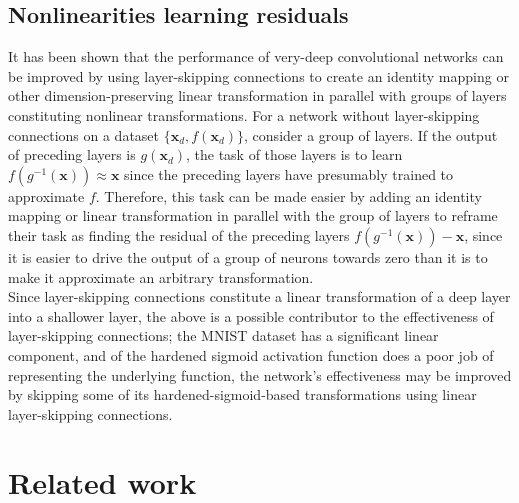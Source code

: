 \documentclass{article}
\newcommand{\mtx}[1]{\bm{#1}}
\newcommand{\npar}{\\\indent}
\begin{document}
\subsection{Nonlinearities learning residuals}
\label{sec:residuals}

It has been shown \cite{he2015, ioffe2015} that the performance of very-deep convolutional networks can be improved by using layer-skipping connections to create an identity mapping or other dimension-preserving linear transformation in parallel with groups of layers constituting nonlinear transformations. For a network without layer-skipping connections on a dataset $\{\mtx{x}_d,f(\mtx{x}_d)\}$, consider a group of layers. If the output of preceding layers is $g(\mtx{x}_d)$, the task of those layers is to learn $f(g^{-1}(\mtx{x}))\approx \mtx{x}$ since the preceding layers have presumably trained to approximate $f$. Therefore, this task can be made easier by adding an identity mapping or linear transformation in parallel with the group of layers to reframe their task as finding the residual of the preceding layers $f(g^{-1}(\mtx{x}))-\mtx{x}$, since it is easier to drive the output of a group of neurons towards zero than it is to make it approximate an arbitrary transformation.
\npar
Since layer-skipping connections constitute a linear transformation of a deep layer into a shallower layer, the above is a possible contributor to the effectiveness of layer-skipping connections; the MNIST dataset has a significant linear component, and of the hardened sigmoid activation function does a poor job of representing the underlying function, the network's effectiveness may be improved by skipping some of its hardened-sigmoid-based transformations using linear layer-skipping connections.


\section{Related work}
\end{document}
